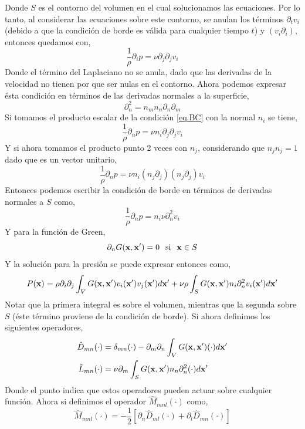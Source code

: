 \documentclass[executivepaper,12pt]{article}
\numberwithin{equation}{section}
\begin{document}
Donde $S$ es el contorno del volumen en el cual solucionamos las ecuaciones. Por lo tanto, al considerar las ecuaciones sobre este contorno, se anulan los términos $\partial_t v_i$ (debido a que la condición de borde es válida para cualquier tiempo $t$) y $(v_i\partial_i)$, entonces quedamos con,
\begin{equation}
	\frac{1}{\rho}\partial_i p=\nu\partial_j \partial_j v_i \label{eq.BC}
\end{equation}
Donde el término del Laplaciano no se anula, dado que las derivadas de la velocidad no tienen por que ser nulas en el contorno. Ahora podemos expresar ésta condición en términos de las derivadas normales a la superficie,
\begin{equation*}
	\partial^2_n=n_{m}n_n\partial_n\partial_m
\end{equation*}
Si tomamos el producto escalar de la condición \ref{eq.BC} con la normal $n_i$ se tiene,
\begin{equation}
	\frac{1}{\rho}\partial_n p =\nu n_i \partial_j\partial_j v_i
\end{equation}
Y si ahora tomamos el producto punto 2 veces con $n_j$, considerando que $n_j n_j=1$ dado que es un vector unitario,
\begin{equation*}
	\frac{1}{\rho}\partial_n p =\nu n_i (n_j\partial_j)(n_j\partial_j)v_i
\end{equation*}
Entonces podemos escribir la condición de borde en términos de derivadas normales a $S$ como,
\begin{equation*}
	\frac{1}{\rho}\partial_n p=n_i \nu \partial_n^2v_i
\end{equation*}
Y para la función de Green,
\begin{equation*}
	\partial_n G(\vb{x},\vb{x}')=0\hspace{0.25cm} \text{si}\hspace{0.25cm} \vb{x}\in S
\end{equation*}
Y la solución para la presión se puede expresar entonces como,
\begin{equation*}
	P(\vb{x})=\rho\partial_i\partial_j\int_V G(\vb{x},\vb{x}')v_i(\vb{x}')v_j(\vb{x}')d\vb{x}'+\nu\rho\int_S G(\vb{x},\vb{x}')n_i\partial^2_nv_i(\vb{x}') d\vb{x}'
\end{equation*}
Notar que la primera integral es sobre el volumen, mientras que la segunda sobre $S$ (éste término proviene de la condición de borde).
Si ahora definimos los siguientes operadores,
\begin{align*}
	\hat{D}_{mn}(\cdot)&=\delta_{mn}(\cdot)-\partial_m\partial_n\int_V G(\vb{x},\vb{x}')(\cdot)d\vb{x}'\\
	\hat{L}_{mn}(\cdot)&=\nu\partial_m\int_S G(\vb{x},\vb{x}')n_n\partial^2_n(\cdot)d\vb{x}'
\end{align*}
Donde el punto indica que estos operadores pueden actuar sobre cualquier función. Ahora si definimos el operador $\hat{M}_{mnl}(\cdot)$ como,
\begin{equation*}
	\hat{M}_{mnl}(\cdot)=-\frac{1}{2}\left[\partial_n\hat{D}_{ml}(\cdot)+\partial_l\hat{D}_{mn}(\cdot)\right]
\end{equation*}
\end{document}
